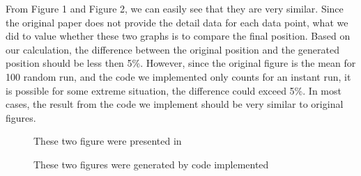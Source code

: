 \documentclass{article}
\begin{document}
From Figure 1 and Figure 2, we can easily see that they are very similar. Since the original paper \cite{6200864} does not provide the detail data for each data point, what we did to value whether these two graphs is to compare the final position. Based on our calculation, the difference between the original position and the generated position should be less then 5\%. However, since the original figure is the mean for 100 random run, and the code we implemented only counts for an instant run, it is possible for some extreme situation, the difference could exceed 5\%. In most cases, the result from the code we implement should be very similar to original figures.
\begin{figure}
    \centering
    \caption{These two figure were presented in \cite{6200864}}
    \label{fig:fig1}
\end{figure}

\begin{figure}
    \centering
    \caption{These two figures were generated by code implemented}
    \label{fig:fig2}
\end{figure}
\end{document}
